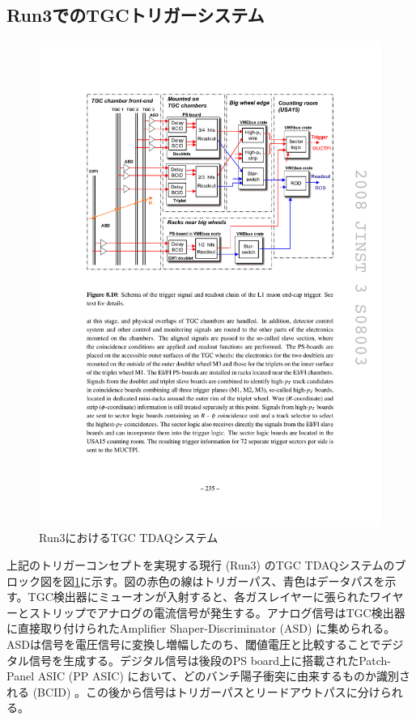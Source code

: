     \subsection{Run3でのTGCトリガーシステム}

\begin{figure} 
\centering
\includegraphics[width=16cm]{fig/Intro/TGC_run3tdaq.pdf}
\caption[Run3におけるTGC TDAQシステム]{Run3におけるTGC TDAQシステム}
\label{TGC_run3tdaq}
\end{figure}

上記のトリガーコンセプトを実現する現行 (Run3) のTGC TDAQシステムのブロック図を図\ref{TGC_run3tdaq}に示す。図の赤色の線はトリガーパス、青色はデータパスを示す。TGC検出器にミューオンが入射すると、各ガスレイヤーに張られたワイヤーとストリップでアナログの電流信号が発生する。アナログ信号はTGC検出器に直接取り付けられたAmplifier Shaper-Discriminator  (ASD) に集められる。ASDは信号を電圧信号に変換し増幅したのち、閾値電圧と比較することでデジタル信号を生成する。デジタル信号は後段のPS board上に搭載されたPatch-Panel ASIC  (PP ASIC) において、どのバンチ陽子衝突に由来するものか識別される  (BCID) 。この後から信号はトリガーパスとリードアウトパスに分けられる。

